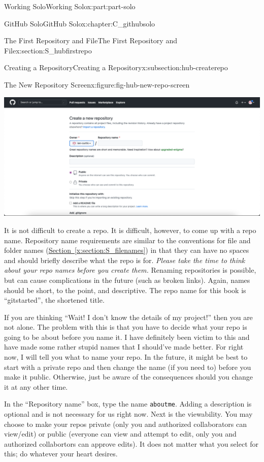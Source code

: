 \documentclass[oneside,10pt,]{book}
\newcommand{\xreffont}{\relax}
\newcommand{\mono}[1]{\texttt{#1}}
\begin{document}
\begin{partptx}{Working Solo}{}{Working Solo}{}{}{x:part:part-solo}
\begin{chapterptx}{GitHub Solo}{}{GitHub Solo}{}{}{x:chapter:C_githubsolo}
\begin{sectionptx}{The First Repository and File}{}{The First Repository and File}{}{}{x:section:S_hubfirstrepo}
\begin{subsectionptx}{Creating a Repository}{}{Creating a Repository}{}{}{x:subsection:hub-createrepo}
\begin{figureptx}{The New Repository Screen}{x:figure:fig-hub-new-repo-screen}{}
\begin{image}{0.05}{0.9}{0.05}
\includegraphics[width=\linewidth]{external/hub_new_repo_screen.pdf}
\end{image}%
\tcblower
\end{figureptx}%
It is not difficult to create a repo. It is difficult, however, to come up with a repo name. Repository name requirements are similar to the conventions for file and folder names (\hyperref[x:section:S_filenames]{Section~{\xreffont\ref{x:section:S_filenames}}}) in that they can have no spaces and should briefly describe what the repo is for. \emph{Please take the time to think about your repo names before you create them.} Renaming repositories is possible, but can cause complications in the future (such as broken links). Again, names should be short, to the point, and descriptive. The repo name for this book is ``gitstarted'', the shortened title.%
\par
If you are thinking ``Wait! I don't know the details of my project!'' then you are not alone. The problem with this is that you have to decide what your repo is going to be about before you name it. I have definitely been victim to this and have made some rather stupid names that I should've made better. For right now, I will tell you what to name your repo. In the future, it might be best to start with a private repo and then change the name (if you need to) before you make it public. Otherwise, just be aware of the consequences should you change it at any other time.%
\par
In the ``Repository name'' box, type the name \mono{aboutme}. Adding a description is optional and is not necessary for us right now. Next is the viewability. You may choose to make your repos private (only you and authorized collaborators can view\slash{}edit) or public (everyone can view and attempt to edit, only you and authorized collabortors can approve edits). It does not matter what you select for this; do whatever your heart desires.%
\par

\end{subsectionptx}
\end{sectionptx}
\end{chapterptx}
\end{partptx}
\end{document}
